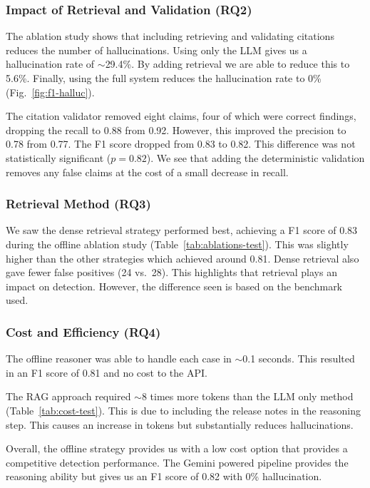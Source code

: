 \documentclass[conference]{IEEEtran}
\begin{document}
\subsubsection{Impact of Retrieval and Validation (RQ2)}

The ablation study shows that including retrieving and validating citations reduces the number of
hallucinations. Using only the LLM gives us a hallucination rate of $\sim$29.4\%. By adding retrieval
we are able to reduce this to 5.6\%. Finally, using the full system reduces the hallucination rate
to 0\% (Fig.~\ref{fig:f1-halluc}).

The citation validator removed eight claims, four of which were correct findings, dropping the
recall to 0.88 from 0.92.
However, this improved the precision to 0.78 from 0.77. The F1 score dropped from 0.83 to 0.82. This
difference was not statistically significant ($p = 0.82$). We see that adding the deterministic
validation removes any false claims at the cost of a small decrease in recall.

\subsubsection{Retrieval Method (RQ3)}

We saw the dense retrieval strategy performed best, achieving a F1 score of 0.83 during the offline
ablation study (Table~\ref{tab:ablations-test}). This was slightly higher than the other strategies which
achieved around 0.81. Dense retrieval also gave fewer false positives (24 vs.\ 28). This highlights that retrieval plays an impact on detection. However, the difference
seen is based on the benchmark used.

\subsubsection{Cost and Efficiency (RQ4)}

The offline reasoner was able to handle each case in $\sim$0.1 seconds. This resulted in an F1 score
of 0.81 and no cost to the API.

The RAG approach required $\sim$8 times more tokens than the LLM only method
(Table~\ref{tab:cost-test}). This is due to
including the release notes in the reasoning step. This causes an increase in tokens but
substantially reduces hallucinations.

Overall, the offline strategy provides us with a low cost option that provides a competitive
detection performance. The Gemini powered pipeline provides the reasoning ability but gives us an
F1 score of 0.82 with 0\% hallucination.
\end{document}
